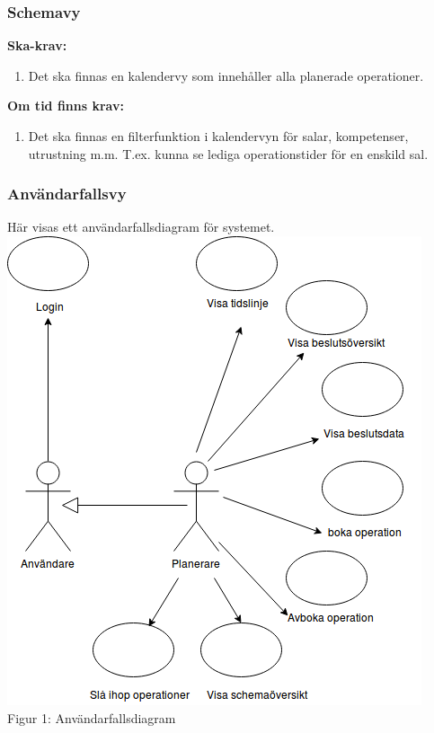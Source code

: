 \documentclass{article}
\begin{document}
\subsubsection{Schemavy}
\textbf{Ska-krav: }
\begin{enumerate}
\item Det ska finnas en kalendervy som innehåller alla planerade operationer.
\end{enumerate}
\textbf{Om tid finns krav:}
\begin{enumerate}
\item Det ska finnas en filterfunktion i kalendervyn för salar, kompetenser, utrustning m.m. T.ex. kunna se lediga operationstider för en enskild sal.
\end{enumerate}

\subsubsection{Användarfallsvy}

Här visas ett användarfallsdiagram för systemet.\\

\includegraphics[width=\textwidth,height=.7\textheight]{Usecasediagram.png}\\
Figur 1: Användarfallsdiagram
\end{document}
